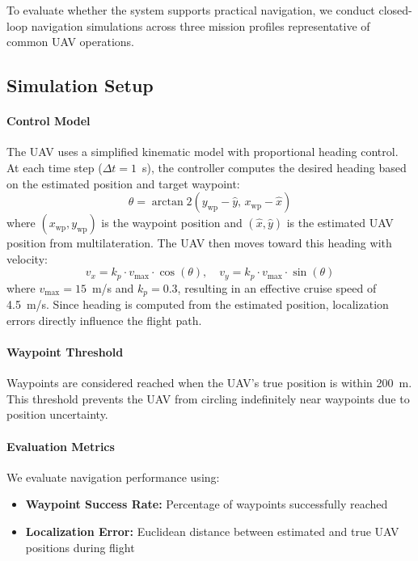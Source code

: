 \documentclass[master,final,11pt]{iscs-thesis}
\begin{document}
To evaluate whether the system supports practical navigation, we conduct closed-loop navigation simulations across three mission profiles representative of common UAV operations.

\subsection{Simulation Setup}

\paragraph{Control Model}
The UAV uses a simplified kinematic model with proportional heading control.
At each time step ($\Delta t = 1$~s), the controller computes the desired heading based on the estimated position and target waypoint:
\begin{equation}
    \theta = \arctan2(y_{\text{wp}} - \hat{y}, \, x_{\text{wp}} - \hat{x})
\end{equation}
where $(x_{\text{wp}}, y_{\text{wp}})$ is the waypoint position and $(\hat{x}, \hat{y})$ is the estimated UAV position from multilateration.
The UAV then moves toward this heading with velocity:
\begin{equation}
    v_x = k_p \cdot v_{\max} \cdot \cos(\theta), \quad v_y = k_p \cdot v_{\max} \cdot \sin(\theta)
\end{equation}
where $v_{\max} = 15$~m/s and $k_p = 0.3$, resulting in an effective cruise speed of 4.5~m/s.
Since heading is computed from the estimated position, localization errors directly influence the flight path.

\paragraph{Waypoint Threshold}
Waypoints are considered reached when the UAV's true position is within 200~m.
This threshold prevents the UAV from circling indefinitely near waypoints due to position uncertainty.

\paragraph{Evaluation Metrics}
We evaluate navigation performance using:
\begin{itemize}
    \item \textbf{Waypoint Success Rate:} Percentage of waypoints successfully reached
    \item \textbf{Localization Error:} Euclidean distance between estimated and true UAV positions during flight
\end{itemize}
\end{document}
